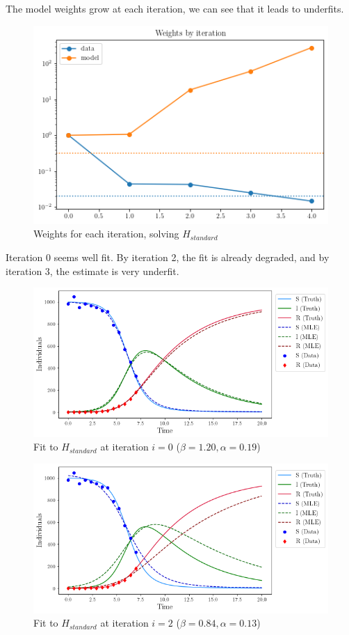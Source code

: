 The model weights grow at each iteration, we can see that it leads to
underfits.

\begin{figure}
\centering
\includegraphics{img/standard_weights.png}
\caption{Weights for each iteration, solving \(H_{standard}\)}
\end{figure}

Iteration 0 seems well fit. By iteration 2, the fit is already degraded,
and by iteration 3, the estimate is very underfit.

\begin{figure}
\centering
\includegraphics{img/standard_fit_iter0.png}
\caption{Fit to \(H_{standard}\) at iteration \(i=0\)
(\(\beta=1.20, \alpha=0.19\))}
\end{figure}

\begin{figure}
\centering
\includegraphics{img/standard_fit_iter2.png}
\caption{Fit to \(H_{standard}\) at iteration \(i=2\)
(\(\beta=0.84, \alpha=0.13\))}
\end{figure}

